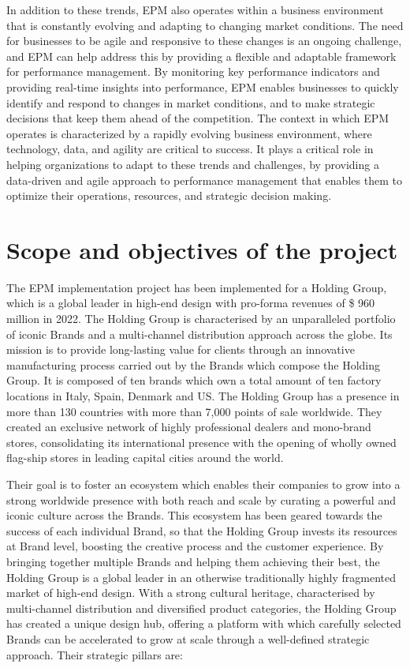 \documentclass[12pt,a4paper,openright,twoside]{book}
\begin{document}
In addition to these trends, EPM also operates within a business environment that is constantly evolving and adapting to changing market conditions. 
%
The need for businesses to be agile and responsive to these changes is an ongoing challenge, and EPM can help address this by providing a flexible and adaptable framework for performance management. 
%
By monitoring key performance indicators and providing real-time insights into performance, EPM enables businesses to quickly identify and respond to changes in market conditions, and to make strategic decisions that keep them ahead of the competition.
%
The context in which EPM operates is characterized by a rapidly evolving business environment, where technology, data, and agility are critical to success. 
%
It plays a critical role in helping organizations to adapt to these trends and challenges, by providing a data-driven and agile approach to performance management that enables them to optimize their operations, resources, and strategic decision making.

\section{Scope and objectives of the project}

The EPM implementation project has been implemented for a Holding Group, which is a global leader in high-end design with pro-forma revenues of \$ 960 million in 2022.
%
The Holding Group is characterised by an unparalleled portfolio of iconic Brands and a multi-channel distribution approach across the globe.
%
Its mission is to provide long-lasting value for clients through an innovative manufacturing process carried out by the Brands which compose the Holding Group.
%
It is composed of ten brands which own a total amount of ten factory locations in Italy, Spain, Denmark and US.
%
The Holding Group has a presence in more than 130 countries with more than 7,000 points of sale worldwide. 
%
They created an exclusive network of highly professional dealers and mono-brand stores, consolidating its international presence with the opening of wholly owned flag-ship stores in leading capital cities around the world.

Their goal is to foster an ecosystem which enables their companies to grow into a strong worldwide presence with both reach and scale by curating a powerful and iconic culture across the Brands.
%
This ecosystem has been geared towards the success of each individual Brand, so that the Holding Group invests its resources at Brand level, boosting the creative process and the customer experience.
%
By bringing together multiple Brands and helping them achieving their best, the Holding Group is a global leader in an otherwise traditionally highly fragmented market of high-end design. 
%
With a strong cultural heritage, characterised by multi-channel distribution and diversified product categories, the Holding Group has created a unique design hub, offering a platform with which carefully selected Brands can be accelerated to grow at scale through a well-defined strategic approach.
%
Their strategic pillars are:
\end{document}
